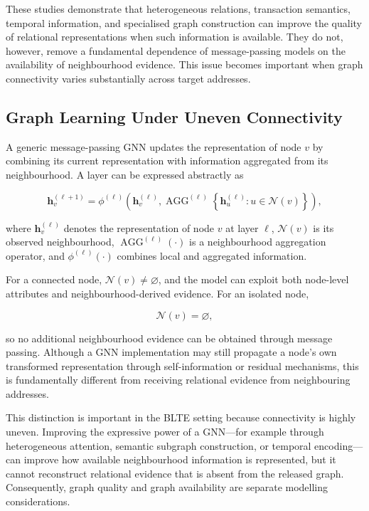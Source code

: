 \documentclass{ieeeaccess}
\begin{document}
These studies demonstrate that heterogeneous relations, transaction semantics, temporal information, and specialised graph construction can improve the quality of relational representations when such information is available. They do not, however, remove a fundamental dependence of message-passing models on the availability of neighbourhood evidence. This issue becomes important when graph connectivity varies substantially across target addresses.

\subsection{Graph Learning Under Uneven Connectivity}

A generic message-passing GNN updates the representation of node $v$ by combining its current representation with information aggregated from its neighbourhood. A layer can be expressed abstractly as

\begin{equation}
\mathbf{h}_{v}^{(\ell+1)}
=
\phi^{(\ell)}
\left(
\mathbf{h}_{v}^{(\ell)},
\operatorname{AGG}^{(\ell)}
\left\{
\mathbf{h}_{u}^{(\ell)}
:
u\in\mathcal{N}(v)
\right\}
\right),
\label{eq:generic_message_passing}
\end{equation}

where $\mathbf{h}_{v}^{(\ell)}$ denotes the representation of node $v$ at layer $\ell$, $\mathcal{N}(v)$ is its observed neighbourhood, $\operatorname{AGG}^{(\ell)}(\cdot)$ is a neighbourhood aggregation operator, and $\phi^{(\ell)}(\cdot)$ combines local and aggregated information.

For a connected node, $\mathcal{N}(v)\neq\varnothing$, and the model can exploit both node-level attributes and neighbourhood-derived evidence. For an isolated node,

\begin{equation}
\mathcal{N}(v)=\varnothing,
\label{eq:isolated_neighbourhood}
\end{equation}

so no additional neighbourhood evidence can be obtained through message passing. Although a GNN implementation may still propagate a node's own transformed representation through self-information or residual mechanisms, this is fundamentally different from receiving relational evidence from neighbouring addresses.

This distinction is important in the BLTE setting because connectivity is highly uneven. Improving the expressive power of a GNN---for example through heterogeneous attention, semantic subgraph construction, or temporal encoding---can improve how available neighbourhood information is represented, but it cannot reconstruct relational evidence that is absent from the released graph. Consequently, graph quality and graph availability are separate modelling considerations.
\end{document}
